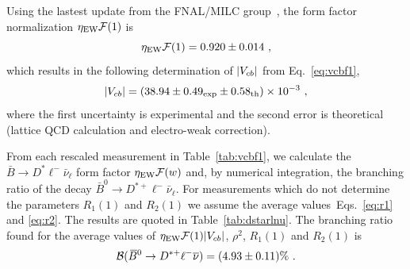 Using the lastest update from the FNAL/MILC
group~\cite{Bailey:2014tva}, the form factor normalization
$\eta_\mathrm{EW}{\cal F}(1)$ is
\begin{equation}
  \eta_\mathrm{EW}{\cal F}(1) = 0.920\pm 0.014~,
\end{equation}
which results in the following determination of $|V_{cb}|$ from
Eq.~\ref{eq:vcbf1},
\begin{equation}
  |V_{cb}| = (38.94\pm 0.49_{\rm exp}\pm 0.58_{\rm th})\times
  10^{-3}~, \label{eq:vcbdstar}
\end{equation}
where the first uncertainty is experimental and the second error is
theoretical (lattice QCD calculation and electro-weak correction).

From each rescaled measurement in Table~\ref{tab:vcbf1}, we
calculate the $\bar B\to D^*\ell^-\bar\nu_\ell$ form factor
$\eta_\mathrm{EW}{\cal F}(w)$ and, by numerical integration, the
branching ratio of the decay $\bar B^0\to
D^{*+}\ell^-\bar\nu_\ell$. For measurements which do not determine the
parameters $R_1(1)$ and $R_2(1)$ we assume the average
values~Eqs.~\ref{eq:r1} and \ref{eq:r2}. The results are quoted in
Table~\ref{tab:dstarlnu}. The branching ratio found for the average
values of $\eta_\mathrm{EW}{\cal F}(1)|V_{cb}|$, $\rho^2$, $R_1(1)$ and
$R_2(1)$ is
\begin{equation}
  {\cal B}(\kern 0.18em\overline{\kern -0.18em B}{}^0 \to D^{*+}\ell^{-}\overline{\nu})=(4.93\pm 0.11)\%~.
\end{equation}

